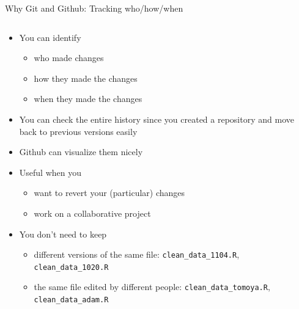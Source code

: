 \documentclass[handout,pdftex,10pt,aspectratio=169]{beamer}
\begin{document}
\begin{frame}{Why Git and Github: Tracking who/how/when}
  \setlength{\leftmarginii}{10pt}
  \begin{columns}%
    \begin{column}{0.46\linewidth}
    \begin{itemize}
      \item<1-> You can identify %
      \begin{itemize}
        \item<1-> who made changes 
        \item<2-> how they made the changes
        \item<3-> when they made the changes
      \end{itemize}
      \item<4-> You can check the entire history since you created a repository
      and move back to previous versions easily
      \item<5-> Github can visualize them nicely
      \medskip
      \item<7-> Useful when you 
      \begin{itemize}
        \item<7-> want to revert your (particular) changes
        \item<8-> work on a collaborative project
      \end{itemize}
      \medskip
      \item<9-> You don't need to keep 
      \begin{itemize}
        \item<9-> different versions of the same file: \texttt{clean\_data\_1104.R}, \texttt{clean\_data\_1020.R}
        \item<10-> the same file edited by different people: \texttt{clean\_data\_tomoya.R}, \texttt{clean\_data\_adam.R}
      \end{itemize}
    \end{itemize}      
  \end{column}\hfill
  \begin{column}{0.53\linewidth}
    \centering

\end{column}
\end{columns}
\end{frame}
\end{document}

